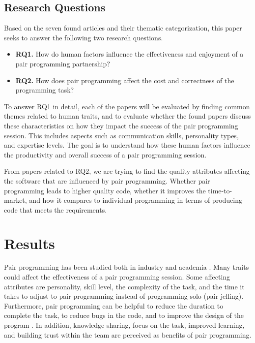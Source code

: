 \documentclass[conference]{IEEEtran}
\begin{document}
\subsection{Research Questions}

Based on the seven found articles and their thematic categorization, this paper seeks to answer the following two research questions.

\begin{itemize}
    \item \textbf{RQ1.} How do human factors influence the effectiveness and enjoyment of a pair programming partnership?
    \item \textbf{RQ2.} How does pair programming affect the cost and correctness of the programming task?
\end{itemize}

To answer RQ1 in detail, each of the papers will be evaluated by finding common themes related to human traits, and to evaluate whether the found papers discuss these characteristics on how they impact the success of the pair programming session. This includes aspects such as communication skills, personality types, and expertise levels. The goal is to understand how these human factors influence the productivity and overall success of a pair programming session.

From papers related to RQ2, we are trying to find the quality attributes affecting the software that are influenced by pair programming. Whether pair programming leads to higher quality code, whether it improves the time-to-market, and how it compares to individual programming in terms of producing code that meets the requirements. 

\section{Results}

Pair programming has been studied both in industry and academia \cite{Williams2000Strengthening, 10.1145/1414004.1414026, Hannay2009effectiveness}. Many traits could affect the effectiveness of a pair programming session. Some affecting attributes are personality, skill level, the complexity of the task, and the time it takes to adjust to pair programming instead of programming solo (pair jelling). Furthermore, pair programming can be helpful to reduce the duration to complete the task, to reduce bugs in the code, and to improve the design of the program \cite{10.1145/2652524.2652529}. In addition, knowledge sharing, focus on the task, improved learning, and building trust within the team are perceived as benefits of pair programming.
\end{document}
